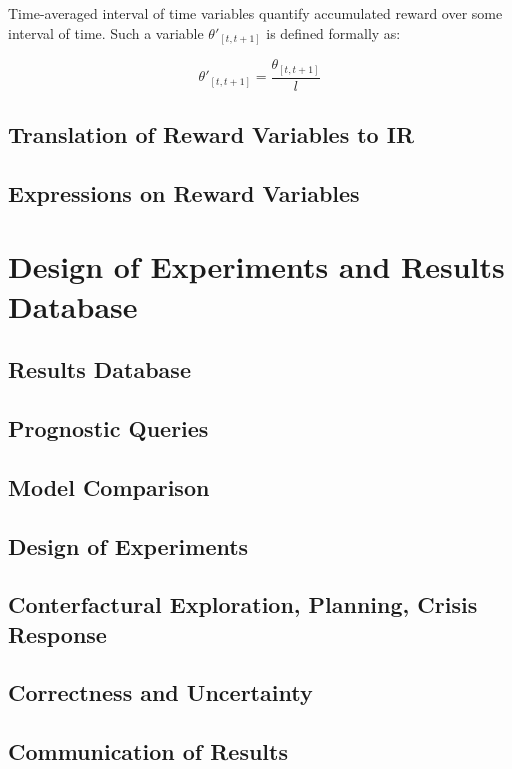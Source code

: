 \documentclass[11pt]{article}
\begin{document}
Time-averaged interval of time variables quantify accumulated reward over some interval of time.  Such a variable $\theta'_{[t,t+1]}$ is defined formally as:

\[\theta'_{[t,t+1]} = \frac{\theta_{[t,t+1]}}{l}\]

\subsection{Translation of Reward Variables to IR}

\subsection{Expressions on Reward Variables}

\section{Design of Experiments and Results Database}
\subsection{Results Database}

\subsection{Prognostic Queries}

\subsection{Model Comparison}

\subsection{Design of Experiments}

\subsection{Conterfactural Exploration, Planning, Crisis Response}

\subsection{Correctness and Uncertainty}

\subsection{Communication of Results}
\end{document}
